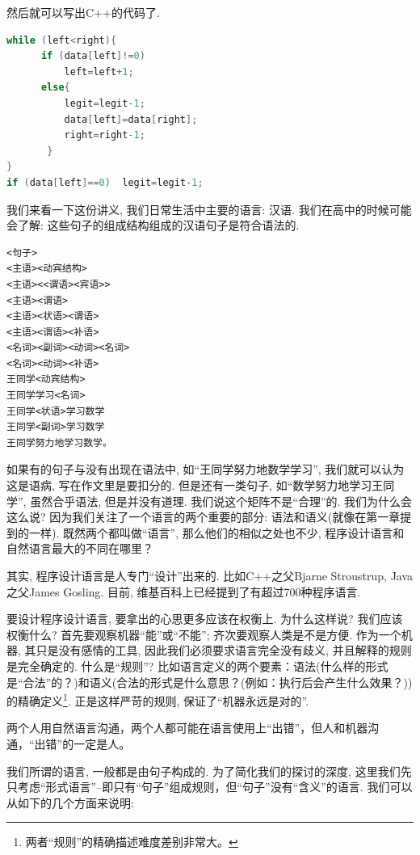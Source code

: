 然后就可以写出C++的代码了. 

\begin{lstlisting}[language=c++]
while (left<right){
      if (data[left]!=0)
          left=left+1;
      else{
          legit=legit-1;
          data[left]=data[right];
          right=right-1;
       }
}
if (data[left]==0)  legit=legit-1;
	\end{lstlisting}



我们来看一下这份讲义, 我们日常生活中主要的语言: 汉语. 我们在高中的时候可能会了解: 这些句子的组成结构组成的汉语句子是符合语法的.  

\begin{lstlisting}
<句子>
<主语><动宾结构>
<主语><<谓语><宾语>>
<主语><谓语>
<主语><状语><谓语>
<主语><谓语><补语>
<名词><副词><动词><名词>
<名词><动词><补语>
王同学<动宾结构>
王同学学习<名词>
王同学<状语>学习数学
王同学<副词>学习数学
王同学努力地学习数学。
\end{lstlisting}

如果有的句子与没有出现在语法中, 如“王同学努力地数学学习”, 我们就可以认为这是语病, 写在作文里是要扣分的. 但是还有一类句子, 如“数学努力地学习王同学”, 虽然合乎语法, 但是并没有道理. 我们说这个矩阵不是“合理”的. 我们为什么会这么说? 因为我们关注了一个语言的两个重要的部分: 语法和语义(就像在第一章提到的一样). 既然两个都叫做``语言'', 那么他们的相似之处也不少, 程序设计语言和自然语言最大的不同在哪里？


其实, 程序设计语言是人专门``设计''出来的. 比如C++之父Bjarne Stroustrup, Java之父James Gosling. 目前, 维基百科上已经提到了有超过700种程序语言. 


要设计程序设计语言, 要拿出的心思更多应该在权衡上. 为什么这样说? 我们应该权衡什么? 首先要观察机器``能''或``不能''; 齐次要观察人类是不是方便. 作为一个机器, 其只是没有感情的工具, 因此我们必须要求语言完全没有歧义, 并且解释的规则是完全确定的. 什么是``规则''? 比如语言定义的两个要素：语法(什么样的形式是“合法”的？)和语义(合法的形式是什么意思？(例如：执行后会产生什么效果？))的精确定义\footnote{两者“规则”的精确描述难度差别非常大。}. 正是这样严苛的规则, 保证了``机器永远是对的''.

两个人用自然语言沟通，两个人都可能在语言使用上“出错”，但人和机器沟通，“出错”的一定是人。

我们所谓的语言, 一般都是由句子构成的. 为了简化我们的探讨的深度, 这里我们先只考虑“形式语言”--即只有“句子”组成规则，但“句子”没有“含义”的语言. 我们可以从如下的几个方面来说明: 

